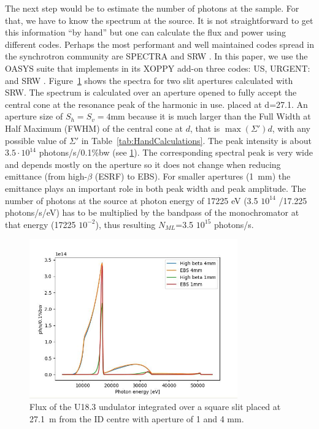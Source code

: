 \documentclass{iucr}              %
\newcommand{\inred}[1]{{\color{red}#1}}
\begin{document}
The next step would be to estimate the number of photons at the sample. For that, we have to know the spectrum at the source. It is not straightforward to get this information ``by hand'' but one can calculate the flux and power using different codes. Perhaps the most performant and well maintained codes spread in the synchrotron community are SPECTRA \cite{codeSPECTRA} and SRW \cite{codeSRW}. In this paper, we use the OASYS suite \cite{codeOASYS} that implements in its XOPPY add-on three codes: US\cite{codeUS}, URGENT: \cite{codeUS} and SRW \cite{codeSRW}. Figure~\ref{fig:FluxU18} shows the spectra for two slit apertures calculated with SRW. The spectrum is calculated over an aperture opened to fully accept the central cone at the resonance peak of the harmonic in use. placed at d=27.1. An aperture size of $S_h=S_v=4$mm  because it is much larger than the Full Width at Half Maximum (FWHM) of the central cone at $d$, that is $\max(\Sigma') d$, with any possible value of $\Sigma'$ in Table~\ref{tab:HandCalculations}. The peak intensity is about  $3.5\cdot10^{14}$ photons/s/0.1{\%}bw (see \ref{fig:FluxU18}). The corresponding spectral peak is very wide and depends mostly on the aperture so it does not change when reducing emittance (from high-$\beta$ (ESRF) to EBS). For smaller apertures (1~mm) the emittance plays an important role in both peak width and peak amplitude. The number of photons at the source at photon energy of 17225 eV \inred{(3.5 $10^{14}$ /17.225 photons/s/eV)} has to be multiplied by the bandpass of the monochromator at that energy \inred{(17225 $10^{-2}$)}, thus resulting $N_{ML}$=3.5 $10^{15}$ photons/s. 

\begin{figure}\label{fig:FluxU18}
    \centering
    \includegraphics[width=0.8\textwidth]{GRAPHICS/fluxU18.jpg}
    \caption{Flux of the U18.3 undulator integrated over a square slit placed at 27.1~m from the ID centre with aperture of 1 and 4 mm.}
\end{figure}
\end{document}
